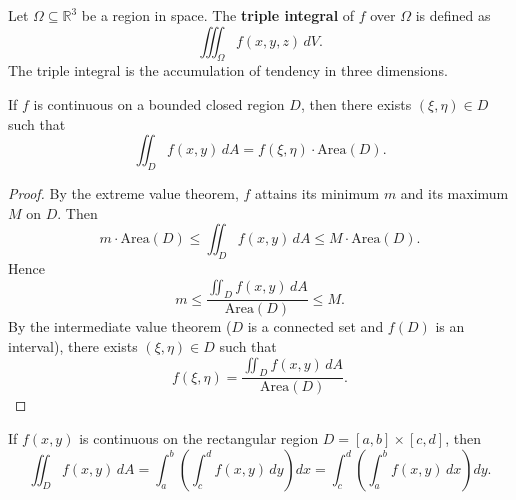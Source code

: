\begin{definition}\label{def:triple_integral}
Let $\Omega \subseteq \mathbb{R}^3$ be a region in space. The \textbf{triple integral} of $f$ over $\Omega$ is defined as
\[\iiint_\Omega f(x, y, z)\,dV.\]
The triple integral is the accumulation of tendency in three dimensions.
\end{definition}

\begin{lemma}\label{lem:integral_mean_value}
If $f$ is continuous on a bounded closed region $D$, then there exists $(\xi, \eta) \in D$ such that
\[\iint_D f(x,y)\,dA = f(\xi, \eta) \cdot \mathrm{Area}(D).\]
\end{lemma}

\begin{proof}
By the extreme value theorem, $f$ attains its minimum $m$ and its maximum $M$ on $D$. Then
\[
m \cdot \mathrm{Area}(D) \le \iint_D f(x,y)\,dA \le M \cdot \mathrm{Area}(D).
\]
Hence
\[
m \le \frac{\iint_D f(x,y)\,dA}{\mathrm{Area}(D)} \le M.
\]
By the intermediate value theorem ($D$ is a connected set and $f(D)$ is an interval), there exists $(\xi, \eta) \in D$ such that
\[
f(\xi, \eta) = \frac{\iint_D f(x,y)\,dA}{\mathrm{Area}(D)}.
\]
\end{proof}

\begin{theorem}\label{thm:fubini}
If $f(x,y)$ is continuous on the rectangular region $D = [a,b] \times [c,d]$, then
\[\iint_D f(x,y)\,dA = \int_a^b \left( \int_c^d f(x,y)\,dy \right) dx = \int_c^d \left( \int_a^b f(x,y)\,dx \right) dy.\]
\end{theorem}

